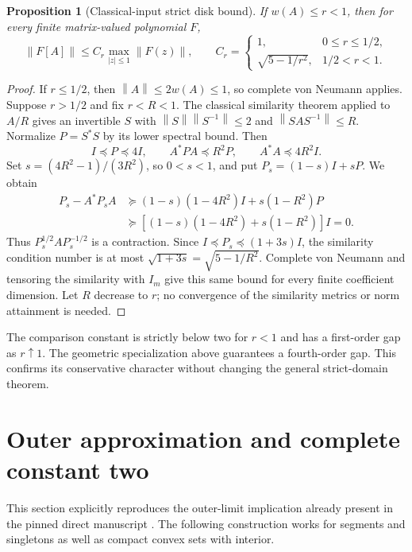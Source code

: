 \documentclass[11pt]{article}
\newtheorem{proposition}[theorem]{Proposition}
\theoremstyle{remark}\newtheorem{remark}[theorem]{Remark}
\newcommand{\norm}[1]{\left\lVert #1\right\rVert}
\begin{document}
\begin{proposition}[Classical-input strict disk bound]\label{prop:classical-disk}
If $w(A)\le r<1$, then for every finite matrix-valued polynomial $F$,
\[
 \norm{F[A]}\le C_r\max_{|z|\le1}\norm{F(z)},\qquad
 C_r=\begin{cases}
 1,&0\le r\le1/2,\\
 \sqrt{5-1/r^2},&1/2<r<1.
 \end{cases}
\]
\end{proposition}
\begin{proof}
If $r\le1/2$, then $\norm A\le2w(A)\le1$, so complete von Neumann applies.
Suppose $r>1/2$ and fix $r<R<1$.
The classical similarity theorem applied to $A/R$ gives an invertible $S$ with
$\norm S\norm{S^{-1}}\le2$ and $\norm{SAS^{-1}}\le R$.
Normalize $P=S^*S$ by its lower spectral bound. Then
\[
 I\preceq P\preceq4I,\qquad A^*PA\preceq R^2P,
 \qquad A^*A\preceq4R^2I.
\]
Set $s=(4R^2-1)/(3R^2)$, so $0<s<1$, and put $P_s=(1-s)I+sP$.
We obtain
\begin{align*}
 P_s-A^*P_sA
 &\succeq(1-s)(1-4R^2)I+s(1-R^2)P\\
 &\succeq[(1-s)(1-4R^2)+s(1-R^2)]I=0.
\end{align*}
Thus $P_s^{1/2}AP_s^{-1/2}$ is a contraction. Since
$I\preceq P_s\preceq(1+3s)I$, the similarity condition number is at most
$\sqrt{1+3s}=\sqrt{5-1/R^2}$.
Complete von Neumann and tensoring the similarity with $I_m$ give this same bound for every finite coefficient dimension. Let $R$ decrease to $r$; no convergence of the similarity metrics or norm attainment is needed.
\end{proof}
The comparison constant is strictly below two for $r<1$ and has a first-order gap as $r\uparrow1$. The geometric specialization above guarantees a fourth-order gap. This confirms its conservative character without changing the general strict-domain theorem.

\section{Outer approximation and complete constant two}\label{sec:outer}
This section explicitly reproduces the outer-limit implication already present in the pinned direct manuscript \cite[Section 4]{OAI}. The following construction works for segments and singletons as well as compact convex sets with interior.
\end{document}
